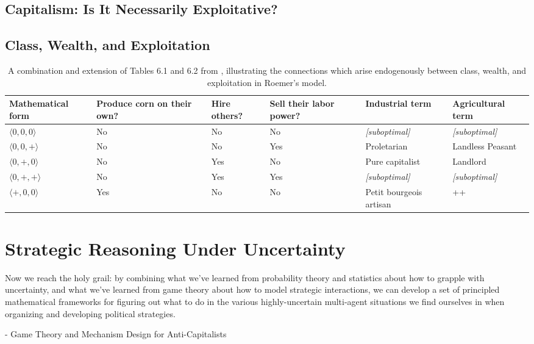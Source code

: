 \documentclass[12pt]{article}
\begin{document}
\subsection{Capitalism: Is It Necessarily Exploitative?}

\subsection{Class, Wealth, and Exploitation}

\begin{table}[ht!]
\begin{small}
\begin{tabular}{p{2cm}p{2cm}p{2cm}p{2cm}p{2cm}p{2cm}} \hline
Mathematical form & Produce corn on their own? & Hire others? & Sell their labor power? & Industrial term & Agricultural term \\ \hline
$\langle 0, 0, 0 \rangle$ & No & No & No & \textit{[suboptimal]} & \textit{[suboptimal]} \\
$\langle 0, 0, + \rangle$ & No & No & Yes & Proletarian & Landless Peasant \\
$\langle 0, +, 0 \rangle$ & No & Yes & No & Pure capitalist & Landlord \\
$\langle 0, +, + \rangle$ & No & Yes & Yes & \textit{[suboptimal]} & \textit{[suboptimal]} \\
$\langle +, 0, 0 \rangle$ & Yes & No & No & Petit bourgeois artisan & ++
\end{tabular}
\end{small}
\caption{A combination and extension of Tables 6.1 and 6.2 from \cite{roemer_free_to_lose}, illustrating the connections which arise endogenously between class, wealth, and exploitation in Roemer's model.}
\end{table}

\section{Strategic Reasoning Under Uncertainty}

Now we reach the holy grail: by combining what we've learned from probability theory and statistics about how to grapple with uncertainty, and what we've learned from game theory about how to model strategic interactions, we can develop a set of principled mathematical frameworks for figuring out what to do in the various highly-uncertain multi-agent situations we find ourselves in when organizing and developing political strategies.

- Game Theory and Mechanism Design for Anti-Capitalists
\end{document}
